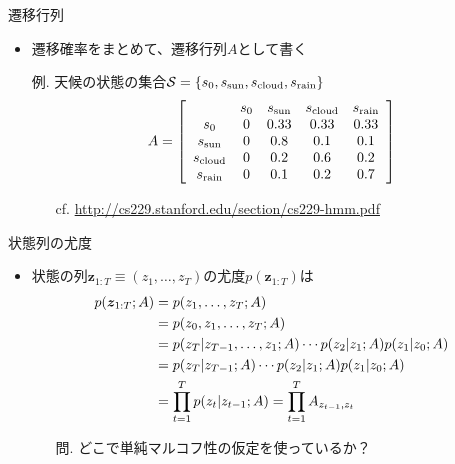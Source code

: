 \documentclass[aspectratio=169,unicode,dvipdfmx,14pt]{beamer}
\begin{document}
\begin{frame}{遷移行列}
\begin{itemize}
\item 遷移確率をまとめて、遷移行列$A$として書く
\item[例.] 天候の状態の集合$\mathcal{S} = \{ s_0, s_{\mbox{\scriptsize sun}},
s_{\mbox{\scriptsize cloud}}, s_{\mbox{\scriptsize rain}} \}$
\begin{align}
A = \left[
    \begin{array}{ccccc}
 & s_0 & s_{\mbox{\scriptsize sun}} & s_{\mbox{\scriptsize cloud}} & s_{\mbox{\scriptsize rain}} \\
s_0 & 0 & 0.33 & 0.33 & 0.33 \\
s_{\mbox{\scriptsize sun}} & 0 & 0.8 & 0.1 & 0.1 \\
s_{\mbox{\scriptsize cloud}} & 0 & 0.2 & 0.6 & 0.2 \\
s_{\mbox{\scriptsize rain}} & 0 & 0.1 & 0.2 & 0.7
    \end{array}
  \right]
\end{align}
\vspace{-.1in}
\begin{itemize}
\item[cf.] \href{http://cs229.stanford.edu/section/cs229-hmm.pdf}{http://cs229.stanford.edu/section/cs229-hmm.pdf}
\end{itemize}
\end{itemize}
\end{frame}

\begin{frame}{状態列の尤度}
\begin{itemize}
\item 状態の列$\bm{z}_{1:T}\equiv(z_1,\ldots,z_T)$の尤度$p(\bm{z}_{1:T})$は
\begin{align}
p(\bm{z}_{1:T};A) & = p(z_1,\ldots,z_T;A) \notag \\
& = p(z_0, z_1,\ldots,z_T;A) \notag \\
& = p(z_T | z_{T-1},\ldots,z_1;A) \cdots p(z_2|z_1;A) p(z_1|z_0;A) \notag \\
& = p(z_T | z_{T-1};A) \cdots p(z_2|z_1;A) p(z_1|z_0;A) \notag \\
& = \prod_{t=1}^T p(z_t | z_{t-1};A) = \prod_{t=1}^T A_{z_{t-1}, z_t}
\label{eq:seq_LH}
\end{align}
\vspace{-.1in}
\begin{itemize}
\item[問.] どこで単純マルコフ性の仮定を使っているか？
\end{itemize}
\end{itemize}
\end{frame}
\end{document}
